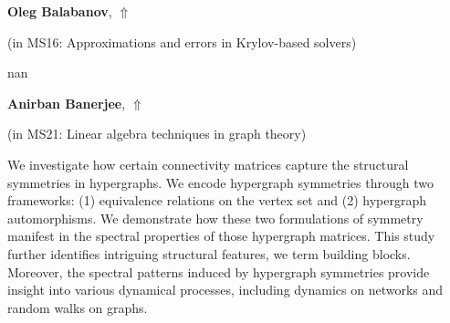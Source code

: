 \documentclass[ILAS2025-program.tex]{subfiles}
\begin{document}
\hypertarget{down0344}{}\begin{ilasabstract}
    
\textbf{Oleg Balabanov},  \hfill \hyperlink{up0344}{$\Uparrow$}
    
    
(in {\color{mstitle}MS16: Approximations and errors in Krylov-based solvers})
        
\mtskip
    nan
\end{ilasabstract}
    

\hypertarget{down0382}{}\begin{ilasabstract}
    
\textbf{Anirban Banerjee},  \hfill \hyperlink{up0382}{$\Uparrow$}
    
    
(in {\color{mstitle}MS21: Linear algebra techniques in graph theory})
        
\mtskip
    We investigate how certain connectivity matrices capture the structural symmetries in hypergraphs. We encode hypergraph symmetries through two frameworks: (1) equivalence relations on the vertex set and (2) hypergraph automorphisms. We demonstrate how these two formulations of symmetry manifest in the spectral properties of those hypergraph matrices. This study further identifies intriguing structural features, we term building blocks. Moreover, the spectral patterns induced by hypergraph symmetries provide insight into various dynamical processes, including dynamics on networks and random walks on graphs.

\end{ilasabstract}
    
\end{document}
